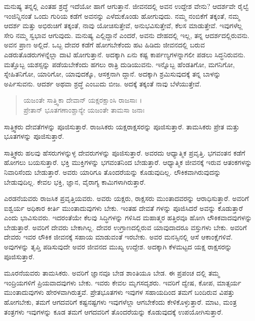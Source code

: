 ಮನುಷ್ಯ ತನ್ನಲ್ಲಿ ಎಂತಹ ಶ್ರದ್ಧೆ ಇದೆಯೋ ಹಾಗೆ ಆಗುತ್ತಾನೆ. ಜೀವನದಲ್ಲಿ ಅವನ ಉದ್ದೇಶ ವೇನು? ಆದರ್ಶವೇ ರೈಲ್ವೆ ಇಂಜಿನ್ನಿನಂತೆ ಒಂದು ಗುರಿಯ ಕಡೆಗೆ ಅವನನ್ನು ಎಳೆದುಕೊಂಡು ಹೋಗುವುದು. ನಮ್ಮ ನಂಬಿಕೆಗೆ ತಕ್ಕಂತೆ, ನಮ್ಮ ಆದರ್ಶ ಮತ್ತು ಅಭಿರುಚಿಗೆ ತಕ್ಕಂತೆ, ನಾವು ಯೋಚಿಸುತ್ತೇವೆ, ಅನುಭವಿಸುತ್ತೇವೆ, ಕೆಲಸ ಮಾಡುತ್ತೇವೆ. ಇವುಗಳೆಲ್ಲ ಸೇರಿ ನಮ್ಮ ಸ್ವಭಾವ ಆಗುವುದು. ಮನುಷ್ಯ ಎಲ್ಲಿದ್ದಾನೆ ಎಂದರೆ, ಅವನು ದೇಹದಲ್ಲಿ ಇಲ್ಲ, ತನ್ನ ಆದರ್ಶದಲ್ಲಿರುವನು. ಅವನ ಪ್ರಾಣ ಅಲ್ಲಿದೆ. ಒಬ್ಬ ದೇವರ ಕಡೆಗೆ ಹೋಗಬೇಕೆಂದು ಹಟ ಹಿಡಿದು ಜೀವನದಲ್ಲಿ ಬರುವ ಎಡರುತೊಡರುಗಳನ್ನೆಲ್ಲಾ ದಾಟಿ ಹೋಗುತ್ತಾನೆ. ಅದಕ್ಕಾಗಿ ಏನು ಕಷ್ಟ ಕಾರ್ಪಣ್ಯಗಳನ್ನಾಗಲೀ ಪಡಲು ಸಿದ್ಧನಿರುವನು. ಮತ್ತೊಬ್ಬ ಯಶಸ್ಸನ್ನು ಪಡೆಯಬೇಕೆಂದು ಹಗಲು ರಾತ್ರಿ ದುಡಿಯುವನು. ಇನ್ನೊಬ್ಬ ಹೆಂಡತಿಗೋ, ಮಗನಿಗೋ, ಸ್ನೇಹಿತನಿಗೋ, ಯಾರಿಗೋ, ಯಾವುದಕ್ಕೊ, ಆಸಕ್ತನಾಗಿ ದ್ದಾನೆ. ಅದಕ್ಕಾಗಿ ಶ್ರಮಿಸುವುದಕ್ಕೆ ತನ್ನ ಬಾಳನ್ನು ಅರ್ಪಿಸುವನು. ಆದರ್ಶ ಅಥವಾ ಶ್ರದ್ಧೆ ಎಂಬುದು ಬೀಜ. ಅದಕ್ಕೆ ತಕ್ಕಂತೆ ನಾವು ಬೆಳೆಯುತ್ತೇವೆ.

\begin{verse}
ಯಜಂತೇ ಸಾತ್ತ್ವಿಕಾ ದೇವಾನ್ ಯಕ್ಷರಕ್ಷಾಂಸಿ ರಾಜಸಾಃ ।\\ಪ್ರೇತಾನ್ ಭೂತಗಣಾಂಶ್ಚಾನ್ಯೇ ಯಜಂತೇ ತಾಮಸಾ ಜನಾಃ 
\end{verse}

{\small ಸಾತ್ತ್ವಿಕರು ದೇವತೆಗಳನ್ನು ಪೂಜಿಸುತ್ತಾರೆ. ರಾಜಸಿಕರು ಯಕ್ಷರಾಕ್ಷಸರನ್ನು ಪೂಜಿಸುತ್ತಾರೆ. ತಾಮಸಿಕರು ಪ್ರೇತ ಮತ್ತು ಭೂತಗಳನ್ನು ಪೂಜಿಸುತ್ತಾರೆ.}

ಸಾತ್ತ್ವಿಕರು ಹಲವು ಹೆಸರುಗಳನ್ನುಳ್ಳ ದೇವರುಗಳನ್ನು ಪೂಜಿಸುತ್ತಾರೆ. ಅವರದು ಆಧ್ಯಾತ್ಮಿಕ ಪ್ರವೃತ್ತಿ. ಭಗವಂತನ ಕಡೆಗೆ ಹೋಗಲು ಬಯಸುತ್ತಾರೆ. ಭಕ್ತಿ ಮುಕ್ತಿಗಳನ್ನು ಭಗವಂತನಿಂದ ಬೇಡುತ್ತಾರೆ. ಆಧ್ಯಾತ್ಮಿಕ ಜೀವನಕ್ಕೆ ಇರುವ ಆತಂಕಗಳನ್ನು ನಿವಾರಿಸೆಂದು ಬೇಡುತ್ತಾರೆ. ಅವರು ಯಾರಿಗೂ ತೊಂದರೆಯನ್ನು ಕೊಡುವುದಿಲ್ಲ. ಲೌಕಿಕವಾಗಿರುವುದನ್ನು ಬೇಡುವುದಿಲ್ಲ. ಕೇವಲ ಭಕ್ತಿ, ಜ್ಞಾನ, ವೈರಾಗ್ಯ ಕಾಮಿಗಳಾಗಿರುತ್ತಾರೆ.

ಎರಡನೆಯವರು ರಾಜಸಿಕ ಪ್ರವೃತ್ತಿಯವರು. ಅವರು ಯಕ್ಷರು, ರಾಕ್ಷಸರು ಮುಂತಾದವರನ್ನು ಆರಾಧಿಸುತ್ತಾರೆ. ಅವರಿಗೆ ಐಶ್ವರ್ಯ ಅಧಿಕಾರ ಕೀರ್ತಿ ಮುಂತಾದುವುಗಳು ಬೇಕು. ಇಂತಹ ದೇವತೆ ಗಳನ್ನು ಪೂಜಿಸಿದರೆ ಅವನ್ನು ಕೊಡುತ್ತಾರೆ ಎಂದು ಭಾವಿಸುವರು. ಇದರಂತೆಯೇ ಕೆಲವು ಸಿದ್ಧಿಗಳನ್ನು ಗಳಿಸಿದ ಮಹಾತ್ಮರ ಹತ್ತಿರವೂ ಹೋಗಿ ಲೌಕಿಕವಾದವುಗಳನ್ನು ಬೇಡುತ್ತಾರೆ. ಅವರಿಗೆ ದೇವರು ಬೇಕಾಗಿಲ್ಲ. ದೇವರ ಉಗ್ರಾಣದಲ್ಲಿರುವ ಯಾವುದಾದರೂ ವಸ್ತುಗಳು ಬೇಕು. ಅವರಿಗೆ ದೇವರು ಇವರ ಲೌಕಿಕ ಜೀವನಕ್ಕೆ ಸಹಾಯ ಮಾಡುವಂತೆ ಇರಬೇಕು. ಅವರ ಮನಸ್ಸಿನಲ್ಲಿ ಆಸೆ ಆಕಾಂಕ್ಷೆಗಳಿವೆ. ಅವುಗಳನ್ನು ತೃಪ್ತಿ ಪಡಿಸುವುದೇ ಅವರ ಜೀವನದ ಮುಖ್ಯ ಉದ್ದೇಶ. ಅದಕ್ಕಾಗಿ ಕೆಳಮಟ್ಟದ ಯಕ್ಷ ರಾಕ್ಷಸರನ್ನು ಪೂಜಿಸುತ್ತಾರೆ.

ಮೂರನೆಯವರು ತಾಮಸಿಕರು. ಅವರಿಗೆ ಜ್ಞಾನವೂ ಬೇಡ ಶಾಂತಿಯೂ ಬೇಡ. ಈ ಪ್ರಪಂಚ ದಲ್ಲಿ ತಮ್ಮ ಇಂದ್ರಿಯಗಳಿಗೆ ಪ್ರಿಯವಾದವುಗಳು ಬೇಕು. ಇವರು ಕೇವಲ ಮೃಗಸದೃಶರು. ಇವರಿಗೆ ದ್ವೇಷ, ಕೋಪ, ಮಾತ್ಸರ್ಯ ಮುಂತಾದುವುಗಳು ಹೇರಳವಾಗಿರುತ್ತವೆ. ಪ್ರೇತಭೂತಗಳು ಇವುಗಳ ಸಹಾಯದಿಂದ ತಮಗೆ ಬಂದಿರುವ ವಿಪತ್ತು ಹೋಗಬೇಕು, ತಮಗೆ ಆಗದವರಿಗೆ ಕಷ್ಟನಷ್ಟಗಳು ಇವುಗಳೆಲ್ಲಾ ಆಗಬೇಕೆಂದು ಕೇಳಿಕೊಳ್ಳುತ್ತಾರೆ. ಮಾಟ, ಮಂತ್ರ ತಂತ್ರಗಳು ಇವುಗಳನ್ನು ಕೂಡ ತಮಗೆ ಆಗದವರಿಗೆ ತೊಂದರೆಯನ್ನು ಕೊಡುವುದಕ್ಕೆ ಉಪಯೋಗಿಸುತ್ತಾರೆ.

